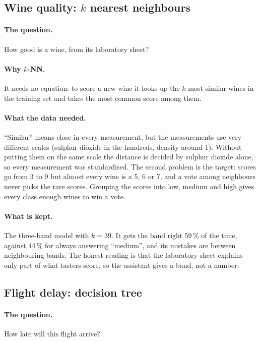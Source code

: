 \subsection{Wine quality: $k$ nearest neighbours}

\paragraph{The question.} How good is a wine, from its laboratory sheet?

\paragraph{Why $k$-NN.} It needs no equation: to score a new wine it looks
up the $k$ most similar wines in the training set and takes the most common
score among them.

\paragraph{What the data needed.} ``Similar'' means close in every
measurement, but the measurements use very different scales (sulphur
dioxide in the hundreds, density around 1). Without putting them on the
same scale the distance is decided by sulphur dioxide alone, so every
measurement was standardised. The second problem is the target: scores go
from 3 to 9 but almost every wine is a 5, 6 or 7, and a vote among
neighbours never picks the rare scores. Grouping the scores into low,
medium and high gives every class enough wines to win a vote.

\paragraph{What is kept.} The three-band model with $k = 39$. It gets the
band right 59\,\% of the time, against 44\,\% for always answering
``medium'', and its mistakes are between neighbouring bands. The honest
reading is that the laboratory sheet explains only part of what tasters
score, so the assistant gives a band, not a number.

\subsection{Flight delay: decision tree}

\paragraph{The question.} How late will this flight arrive?

